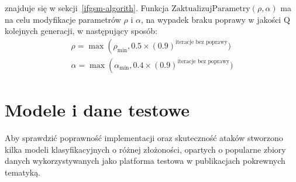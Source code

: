 \documentclass[
    left=2.5cm,         %
    right=2.5cm,        %
    top=2.5cm,          %
    bottom=3cm,         %
    bindingoffset=6mm,  %
    nohyphenation=false %
]{eiti/eiti-thesis}
\begin{document}
znajduje się w sekcji~\ref{ifgsm-algorith}. Funkcja $\text{ZaktualizujParametry}(\rho, \alpha)$ ma na celu
modyfikacje parametrów $\rho$ i \(\alpha\), na wypadek braku poprawy w jakości $\text{Q}$ kolejnych generacji, w następujący sposób:
\begin{equation}
\begin{array}{C}
    \rho = \max \left(\rho_{\min }, 0.5 \times(0.9)^{\text{iteracje bez poprawy}}) \\
    \alpha = \max \left(\alpha_{\min }, 0.4 \times(0.9)^{\text{iteracje bez poprawy}})
\end{array}
\end{equation}



\newpage

\section{Modele i dane testowe}
Aby sprawdzić poprawność implementacji oraz skuteczność ataków stworzono
kilka modeli klasyfikacyjnych o różnej złożoności, opartych o popularne zbiory danych
wykorzystywanych jako platforma testowa w publikacjach pokrewnych tematyką.
\end{document}
